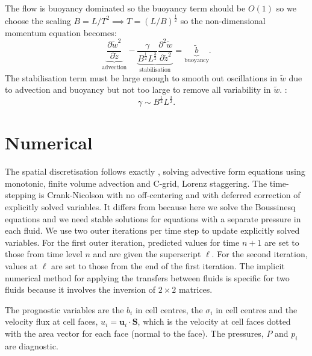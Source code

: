 \documentclass[draft]{agujournal2019}
\begin{document}
The flow is buoyancy dominated so the buoyancy term should be $O(1)$
so we choose the scaling $B=L/T^{2}\implies T=(L/B)^{\frac{1}{2}}$
so the non-dimensional momentum equation becomes:
\begin{equation}
\underbrace{{\frac{\partial\tilde{w}^{2}}{\partial\tilde{z}}}}_{\text{advection}}-\underbrace{{\frac{\gamma}{B^{\frac{1}{2}}L^{\frac{3}{2}}}\frac{\partial^{2}\tilde{w}}{\partial\tilde{z}^{2}}}}_{\text{stabilisation}}=\underbrace{\tilde{b}}_{\text{buoyancy}}.\label{eq:wi_nonDom-1}
\end{equation}
The stabilisation term must be large enough to smooth out oscillations
in $\tilde{w}$ due to advection and buoyancy but not too large to
remove all variability in $\tilde{w}$. :
\begin{equation}
\gamma\sim B^{\frac{1}{2}}L^{\frac{3}{2}}.\label{eq:gammaDimAnal}
\end{equation}
\section{\label{sec:numerics}Numerical }

The spatial discretisation follows exactly , solving
advective form equations using monotonic, finite volume advection
and C-grid, Lorenz staggering. The time-stepping is Crank-Nicolson
with no off-centering and with deferred correction of explicitly solved
variables. It differs from  because here we solve the
Boussinesq equations and we need stable solutions for equations with
a separate pressure in each fluid. We use two outer iterations per
time step to update explicitly solved variables. For the first outer
iteration, predicted values for time $n+1$ are set to those from
time level $n$ and are given the superscript $\ell$. For the second
iteration, values at $\ell$ are set to those from the end of the
first iteration. The implicit numerical method for applying the transfers
between fluids is specific for two fluids because it involves the
inversion of $2\times2$ matrices. 

The prognostic variables are the $b_{i}$ in cell centres, the $\sigma_{i}$
in cell centres and the velocity flux at cell faces, $u_{i}=\mathbf{u}_{i}\cdot\mathbf{S}$,
which is the velocity at cell faces dotted with the area vector for
each face (normal to the face). The pressures, $P$ and $p_{i}$ are
diagnostic.
\end{document}
